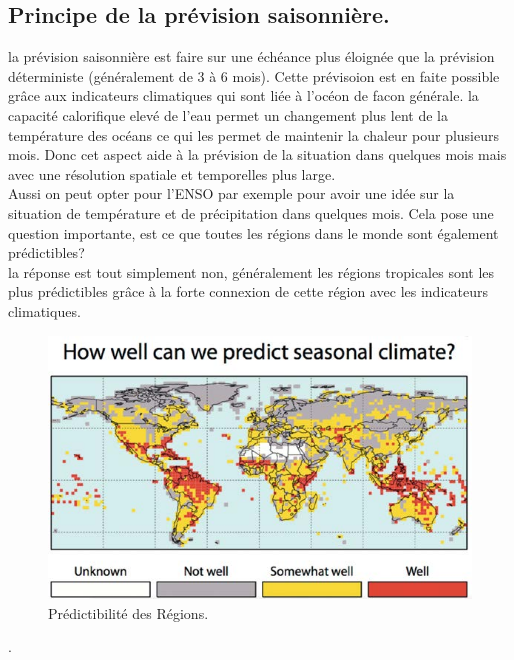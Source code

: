 \documentclass[11pt]{article}
\begin{document}
		
	\subsection{Principe de la prévision saisonnière.}
		la prévision saisonnière est faire sur une échéance plus éloignée que la prévision déterministe (généralement de 3 à 6 mois). Cette prévisoion est en faite possible grâce aux indicateurs climatiques qui sont liée à l'océon de facon générale. la capacité calorifique elevé de l'eau permet un changement plus lent de la température des océans ce qui les permet de maintenir la chaleur pour plusieurs mois. Donc cet aspect aide à la prévision de la situation dans quelques mois mais avec une résolution spatiale et temporelles plus large.\\
		Aussi on peut opter pour l'ENSO par exemple pour avoir une idée sur la situation de température et de précipitation dans quelques mois. Cela pose une question importante, est ce que toutes les régions dans le monde sont également prédictibles? \\ 
		la réponse est tout simplement non, généralement les régions tropicales sont les plus prédictibles grâce à la forte connexion de cette région avec les indicateurs climatiques.   \\

\begin{figure}[h]
    \centering
    \includegraphics[scale=0.5]{REGIONS_PREDICTIBILITY.png}
    \caption*{Prédictibilité des Régions.\footnotemark{} }
\end{figure}
.
\end{document}
